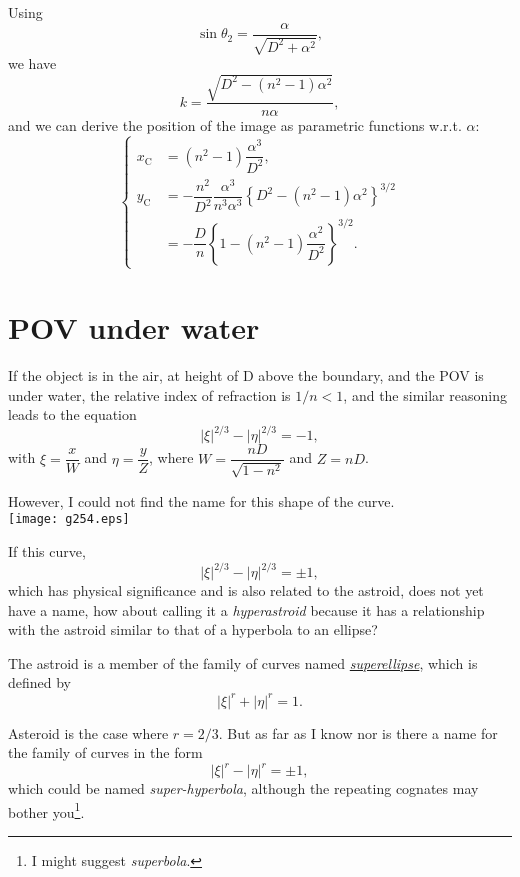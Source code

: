 \documentclass[twocolumn]{article}
\begin{document}
Using 
$$\sin\theta_2 = \dfrac{\alpha}{\sqrt{D^2+\alpha^2}},$$
we have
$$k = \dfrac{\sqrt{D^2-(n^2-1)\alpha^2}}{n\alpha},$$
and we can derive the position of the image as parametric functions w.r.t. $\alpha$:
$$ \left\{ 
\begin{aligned}
	x_{\mathrm{C}}^{} &= (n^2-1)\dfrac{\alpha^3}{D^2},\\
	y_{\mathrm{C}}^{} &= -\dfrac{n^2}{D^2}\dfrac{\alpha^3}{n^3\alpha^3}\left\{ D^2-(n^2-1)\alpha^2 \right\}^{3/2}\\
	&=-\dfrac{D}{n}\left\{ 1-(n^2-1)\dfrac{\alpha^2}{D^2} \right\}^{3/2}.
\end{aligned}
\right.$$

\section{POV under water}
If the object is in the air, at height of D above the boundary, and the POV
is under water, the relative index of refraction is $1/n < 1$, and the similar reasoning
leads to the equation
$$ \left| \xi \right|^{2/3} - \left| \eta \right|^{2/3} = -1, $$
with $\xi = \dfrac{x}{W} $ and $\eta = \dfrac{y}{Z}$, where
$W = \dfrac{nD}{\sqrt{1-n^2}}$ and $Z = nD$.

However, I could not find the name for this shape of the curve.  \\

\texttt{[image: g254.eps]}

If this curve, 
$$ \left| \xi \right|^{2/3} - \left| \eta \right|^{2/3} = \pm1, $$
which has physical significance and is also related to the astroid, does not yet have a name,
how about calling it a \emph{hyperastroid} because it has a relationship with the 
astroid similar to that of a hyperbola to an ellipse?

The astroid is a member of the 
family of curves named \href{https://mathworld.wolfram.com/Astroid.html}{\emph{superellipse}}, which is defined by 
$$ \left| \xi \right|^{r} + \left| \eta \right|^{r} = 1. $$

Asteroid is the case where $r=2/3$. But as far as I know nor is there a name for the 
family of curves in the form
$$ \left| \xi \right|^{r} - \left| \eta \right|^{r} = \pm 1, $$
which could be named \emph{super-hyperbola}, although the repeating cognates may 
bother you\footnote{I might suggest \emph{superbola}.}.

\appendix
\newcommand{\pardiff}[2]{{\frac{\partial #1}{\partial #2}}}
\newcommand{\ilpardiff}[2]{{{\partial #1}/{\partial #2}}}
\end{document}
